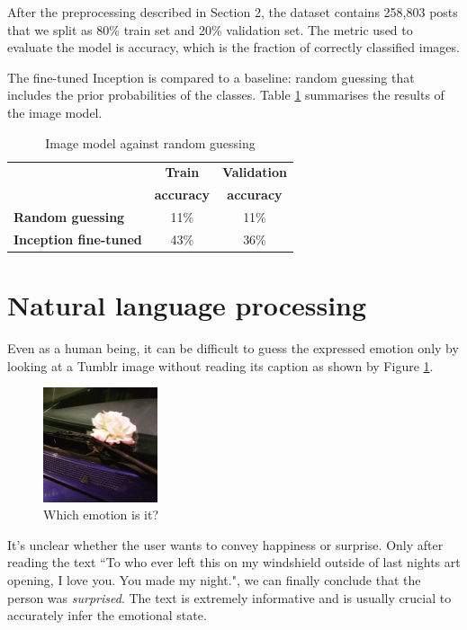 \documentclass{article} %
\begin{document}
After the preprocessing described in Section 2, the dataset contains 258,803 posts that we split as 80\% train set and 20\% validation set. The metric used to evaluate the model is accuracy, which is the fraction of correctly classified images.

The fine-tuned Inception is compared to a baseline: random guessing that includes the prior probabilities of the classes. Table \ref{image-results} summarises the results of the image model.

\begin{table}[H]
\caption{Image model against random guessing}
\begin{center}
    \begin{tabular}{ l | c | c}
    & \textbf{Train} & \textbf{Validation} \\
    & \textbf{accuracy} & \textbf{accuracy} \\ \hline
    \textbf{Random guessing} & 11\% & 11\% \\ \hline
    \textbf{Inception fine-tuned}  & 43\% & 36\% \\
    \end{tabular}
\end{center}
\label{image-results}
\end{table}

\section{Natural language processing}
Even as a human being, it can be difficult to guess the expressed emotion only by looking at a Tumblr image without reading its caption as shown by Figure \ref{surprised-unclear}.

\begin{figure}[H]
    \centering
    \includegraphics[width=0.3\textwidth]{Images/flower.jpg}
    \caption{Which emotion is it?}
    \label{surprised-unclear}
\end{figure}

It's unclear whether the user wants to convey happiness or surprise. Only after reading the text ``To who ever left this on my windshield outside of last nights art opening, I love you. You made my night.", we can finally conclude that the person was {\em surprised}. The text is extremely informative and is usually crucial to accurately infer the emotional state.
\end{document}
